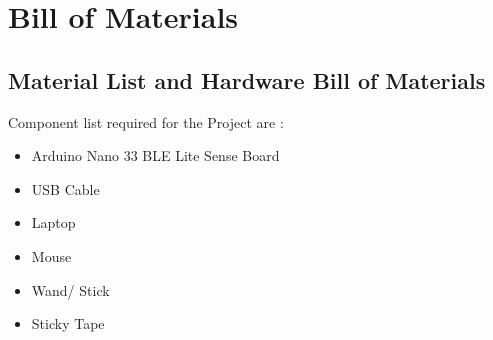 %
%
%



\chapter{Bill of Materials} 

\section{Material List and Hardware Bill of Materials}
Component list required for the Project are :
\begin{itemize}
	\item Arduino Nano 33 BLE Lite Sense Board
	\item USB Cable
	\item Laptop
	\item Mouse
	\item Wand/ Stick
	\item Sticky Tape 
\end{itemize}

\pagebreak

